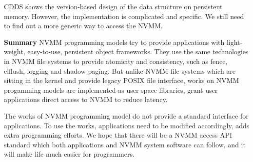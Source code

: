 CDDS shows the version-based design of the data structure on persistent
memory. However, the implementation is complicated and specific. We still
need to find out a more generic way to access the NVMM.


\textbf{Summary} NVMM programming models try to provide
applications with light-weight, easy-to-use, persistent object frameworks.
 They use the same technologies in NVMM file systems to provide atomicity and
consistency, such as fence, clflush, logging and shadow paging.
But unlike NVMM file systems which are sitting in the kernel and provide
legacy POSIX file interface, works on NVMM progamming models are implemented
as user space libraries, grant user applications direct access to NVMM
to reduce latency.

The works of NVMM programming model do not provide a standard interface for
applications. To use the works,
applications need to be modified accordingly, adds extra programming
efforts. We hope that there will be a NVMM access API standard which both
applications and NVMM system software can follow, and it will make life 
much easier for programmers.

